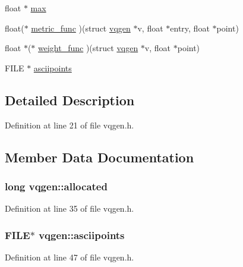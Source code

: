 \begin{DoxyCompactItemize}
\item 
float $\ast$ \hyperlink{structvqgen_adb896c1640a7b1d447562e7fe153385f}{max}
\item 
float($\ast$ \hyperlink{structvqgen_a964d95278df9dff2436146915a656122}{metric\+\_\+func} )(struct \hyperlink{structvqgen}{vqgen} $\ast$v, float $\ast$entry, float $\ast$point)
\item 
float $\ast$($\ast$ \hyperlink{structvqgen_a693e787b291fdbcb74e7952af63924b1}{weight\+\_\+func} )(struct \hyperlink{structvqgen}{vqgen} $\ast$v, float $\ast$point)
\item 
F\+I\+LE $\ast$ \hyperlink{structvqgen_afcbd08153512db099bad79df014e48b9}{asciipoints}
\end{DoxyCompactItemize}


\subsection{Detailed Description}


Definition at line 21 of file vqgen.\+h.



\subsection{Member Data Documentation}
\subsubsection[{\texorpdfstring{allocated}{allocated}}]{\setlength{\rightskip}{0pt plus 5cm}long vqgen\+::allocated}\hypertarget{structvqgen_a49b5acee4eece16cf03b84e05e40c748}{}\label{structvqgen_a49b5acee4eece16cf03b84e05e40c748}


Definition at line 35 of file vqgen.\+h.

\subsubsection[{\texorpdfstring{asciipoints}{asciipoints}}]{\setlength{\rightskip}{0pt plus 5cm}F\+I\+LE$\ast$ vqgen\+::asciipoints}\hypertarget{structvqgen_afcbd08153512db099bad79df014e48b9}{}\label{structvqgen_afcbd08153512db099bad79df014e48b9}


Definition at line 47 of file vqgen.\+h.

